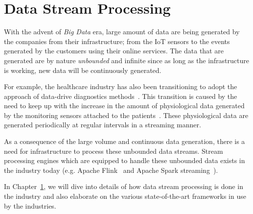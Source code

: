 \chapter{Data Stream Processing}
\label{chap:data_stream_processing}

With the advent of \emph{Big Data} era, large amount of data are being generated 
by the companies from their infrastructure; from the IoT sensors to the events 
generated by the customers using their online services. The data that 
are generated are by nature \emph{unbounded} and infinite since as long 
as the infrastructure is working, new data will be continuously generated. 

For example, the healthcare industry has also been transitioning to 
adopt the approach of data-drive diagnostics methods~\cite{hospital_diagnosis}. 
This transition is caused by the need to keep up with the increase in the amount 
of physiological data generated by the monitoring sensors attached to the 
patients~\cite{hospital_data_monitoring}. These physiological data are generated 
periodically at regular intervals in a streaming manner. 

As a consequence of the large volume and continuous data generation, there is a need for 
infrastructure to process these unbounded data streams. 
Stream processing engines which are equipped to handle these unbounded data exists in 
the industry today (e.g. Apache Flink~\cite{flink} and 
Apache Spark streaming~\cite{spark_streaming}). 

In Chapter~\ref{chap:data_stream_processing}, we will dive into details of 
how data stream processing is done in the industry and also elaborate on the 
various state-of-the-art frameworks in use by the industries. 
